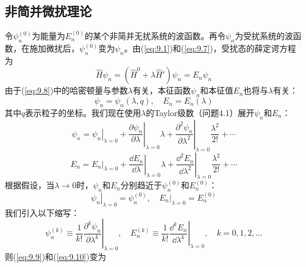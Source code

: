 \subsection*{非简并微扰理论}
    令$\psi_n^{\left(0\right)}$为能量为$E_n^{\left(0\right)}$的某个非简并无扰系统的波函数。再令$\psi_n$为受扰系统的波函数，在施加微扰后，$\psi_n^{\left(0\right)}$变为$\psi_n$。由(\ref{eq:9.1})和(\ref{eq:9.7})，受扰态的薛定谔方程为
    \begin{equation}
        \hat{H}\psi_n = \left(\hat{H}^0 + \lambda \hat{H}'\right)\psi_n = E_n \psi_n
        \label{eq:9.8}
    \end{equation}
    由于(\ref{eq:9.8})中的哈密顿量与参数$\lambda$有关，本征函数$\psi_n$和本征值$E_n$也将与$\lambda$有关：
    \begin{equation*}
        \psi_n = \psi_n\left(\lambda, q\right), \quad E_n = E_n\left(\lambda\right)
    \end{equation*}
    其中$q$表示粒子的坐标。我们现在使用$\lambda$的Taylor级数（问题4.1）展开$\psi_n$和$E_n$：
    \begin{equation}
        \psi_n = \left. \psi_n \right|_{\lambda=0} + \left. \frac{\partial \psi_n}{\partial \lambda} \right|_{\lambda=0}\lambda + \left. \frac{\partial^2 \psi_n}{\partial \lambda^2} \right|_{\lambda=0}\frac{\lambda^2}{2!} + \cdots
        \label{eq:9.9}
    \end{equation}
    \begin{equation}
        E_n = \left. E_n \right|_{\lambda=0} + \left. \frac{\dd E_n}{\dd \lambda} \right|_{\lambda=0}\lambda + \left. \frac{\dd ^2 E_n}{\dd \lambda^2} \right|_{\lambda=0}\frac{\lambda^2}{2!} + \cdots
        \label{eq:9.10}
    \end{equation}
    根据假设，当$\lambda \to 0$时，$\psi_n$和$E_n$分别趋近于$\psi_n^{\left(0\right)}$和$E_n^{\left(0\right)}$：
    \begin{equation}
        \left. \psi_n \right|_{\lambda=0} = \psi_n^{\left(0\right)}, \quad \left. E_n \right|_{\lambda=0} = E_n^{\left(0\right)}
        \label{eq:9.11}
    \end{equation}
    我们引入以下缩写：
    \begin{equation}
        \psi_n^{\left(k\right)} \equiv \frac{1}{k!} \left. \frac{\partial^k \psi_n}{\partial \lambda^k} \right|_{\lambda=0}, \quad E_n^{\left(k\right)} \equiv \frac{1}{k!} \left. \frac{\dd ^k E_n}{\dd \lambda^k} \right|_{\lambda=0}, \quad k = 0, 1, 2, \ldots
        \label{eq:9.12}
    \end{equation}
    则(\ref{eq:9.9})和(\ref{eq:9.10})变为

